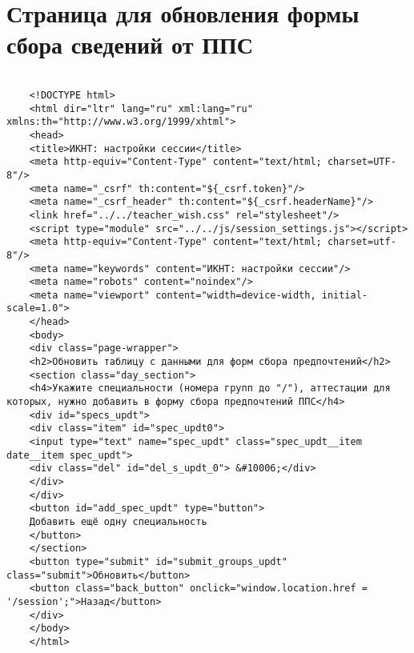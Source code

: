 \chapter{Страница для обновления формы сбора сведений от ППС}\label{appendix-updt}	

\begin{lstlisting}
	
	<!DOCTYPE html>
	<html dir="ltr" lang="ru" xml:lang="ru" xmlns:th="http://www.w3.org/1999/xhtml">
	<head>
	<title>ИКНТ: настройки сессии</title>
	<meta http-equiv="Content-Type" content="text/html; charset=UTF-8"/>
	<meta name="_csrf" th:content="${_csrf.token}"/>
	<meta name="_csrf_header" th:content="${_csrf.headerName}"/>
	<link href="../../teacher_wish.css" rel="stylesheet"/>
	<script type="module" src="../../js/session_settings.js"></script>
	<meta http-equiv="Content-Type" content="text/html; charset=utf-8"/>
	<meta name="keywords" content="ИКНТ: настройки сессии"/>
	<meta name="robots" content="noindex"/>
	<meta name="viewport" content="width=device-width, initial-scale=1.0">
	</head>
	<body>
	<div class="page-wrapper">
	<h2>Обновить таблицу с данными для форм сбора предпочтений</h2>
	<section class="day_section">
	<h4>Укажите специальности (номера групп до "/"), аттестации для которых, нужно добавить в форму сбора предпочтений ППС</h4>
	<div id="specs_updt">
	<div class="item" id="spec_updt0">
	<input type="text" name="spec_updt" class="spec_updt__item date__item spec_updt">
	<div class="del" id="del_s_updt_0"> &#10006;</div>
	</div>
	</div>
	<button id="add_spec_updt" type="button">
	Добавить ещё одну специальность
	</button>
	</section>
	<button type="submit" id="submit_groups_updt" class="submit">Обновить</button>
	<button class="back_button" onclick="window.location.href = '/session';">Назад</button>
	</div>
	</body>
	</html>
	
\end{lstlisting}